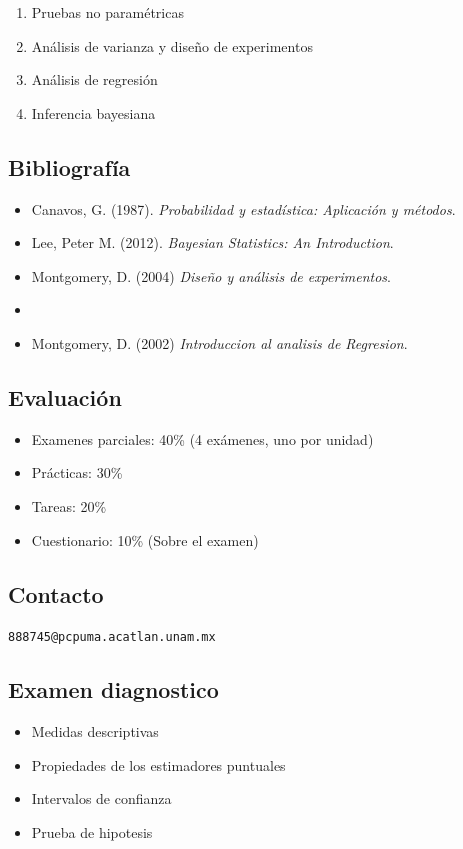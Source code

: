 \documentclass{article}
\begin{document}
\begin{enumerate}
    \item Pruebas no paramétricas
    \item Análisis de varianza y diseño de experimentos
    \item Análisis de regresión
    \item Inferencia bayesiana
\end{enumerate}

\subsection{Bibliografía}

\begin{itemize}
    \item Canavos, G. (1987). \textit{Probabilidad y estadística: Aplicación y métodos}.
    \item Lee, Peter M. (2012). \textit{Bayesian Statistics: An Introduction}.
    \item Montgomery, D. (2004) \textit{Diseño y análisis de experimentos}.
    \item \item Montgomery, D. (2002) \textit{Introduccion al analisis de Regresion}.
\end{itemize}

\subsection{Evaluación}

\begin{itemize}
    \item Examenes parciales: 40\% (4 exámenes, uno por unidad)
    \item Prácticas: 30\%
    \item Tareas: 20\%
    \item Cuestionario: 10\% (Sobre el examen)
\end{itemize}

\subsection{Contacto}

\texttt{888745@pcpuma.acatlan.unam.mx}

\subsection{Examen diagnostico}
\begin{itemize}
    \item Medidas descriptivas
    \item Propiedades de los estimadores puntuales
    \item Intervalos de confianza
    \item Prueba de hipotesis
\end{itemize}
\end{document}
